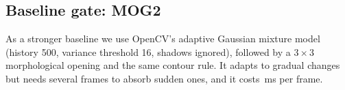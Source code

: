 \subsection{Baseline gate: MOG2}\label{sec:mog}
As a stronger baseline we use OpenCV's adaptive Gaussian mixture model~\cite{zivkovic2004improved} (history 500, variance threshold 16, shadows ignored), followed by a $3\times3$ morphological opening and the same contour rule. It adapts to gradual changes but needs several frames to absorb sudden ones, and it costs \GateMsMOG\,ms per frame.
